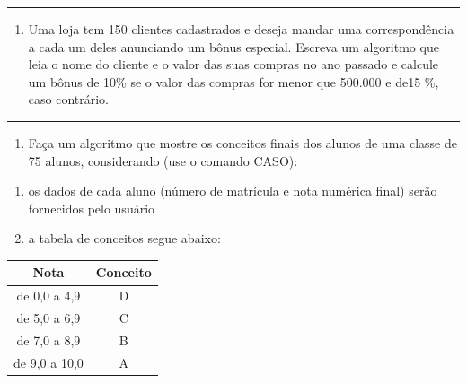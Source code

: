 \documentclass[12pt,a4paper]{article}
\providecommand{\tightlist}{%
      \setlength{\itemsep}{0pt}\setlength{\parskip}{0pt}}
\begin{document}
    \begin{center}\rule{0.5\linewidth}{0.5pt}\end{center}

\begin{enumerate}
\def\labelenumi{\arabic{enumi}.}
\setcounter{enumi}{12}
\tightlist
\item
  Uma loja tem 150 clientes cadastrados e deseja mandar uma
  correspondência a cada um deles anunciando um bônus especial. Escreva
  um algoritmo que leia o nome do cliente e o valor das suas compras no
  ano passado e calcule um bônus de 10\% se o valor das compras for
  menor que 500.000 e de15 \%, caso contrário.
\end{enumerate}

    \begin{center}\rule{0.5\linewidth}{0.5pt}\end{center}

\begin{enumerate}
\def\labelenumi{\arabic{enumi}.}
\setcounter{enumi}{13}
\tightlist
\item
  Faça um algoritmo que mostre os conceitos finais dos alunos de uma
  classe de 75 alunos, considerando (use o comando CASO):
\end{enumerate}

\begin{enumerate}
\def\labelenumi{\alph{enumi})}
\item
  os dados de cada aluno (número de matrícula e nota numérica final)
  serão fornecidos pelo usuário
\item
  a tabela de conceitos segue abaixo:
\end{enumerate}

\begin{longtable}[]{@{}cc@{}}
\toprule()
Nota & Conceito \\
\midrule()
\endhead
de 0,0 a 4,9 & D \\
de 5,0 a 6,9 & C \\
de 7,0 a 8,9 & B \\
de 9,0 a 10,0 & A \\
\bottomrule()
\end{longtable}


    
    
    
\end{document}
